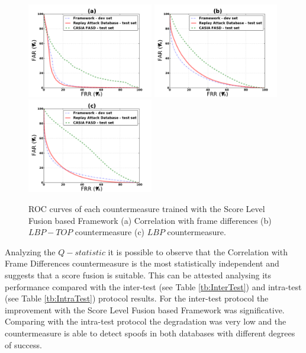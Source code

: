 \begin{figure}[ht]
\begin{center}

\includegraphics [width=5.5cm] {plots/FRAMEWORK/MOTION/SUM.pdf} 
\includegraphics [width=5.5cm] {plots/FRAMEWORK/LBPTOP/SUM.pdf}
\includegraphics [width=5.5cm] {plots/FRAMEWORK/LBP/SUM.pdf}

\caption[ROC curves of each countermeasure trained with the Score Level Fusion based Framework]{ROC curves of each countermeasure trained with the Score Level Fusion based Framework (a) Correlation with frame differences (b) $LBP-TOP$ countermeasure (c) $LBP$ countermeasure.} 
\label{fig:ROC_framework}
\end{center}
\end{figure}

Analyzing the $Q-statistic$ it is  possible to observe that the Correlation with Frame Differences countermeasure is the most statistically independent and suggests that a score fusion is suitable. This can be attested analysing its performance compared with the inter-test (see Table \ref{tb:InterTest}) and intra-test (see Table \ref{tb:IntraTest}) protocol results. For the inter-test protocol the improvement with the Score Level Fusion based Framework was significative. Comparing with the intra-test protocol the degradation was very low and the countermeasure is able to detect spoofs in both databases with different degrees of success.

